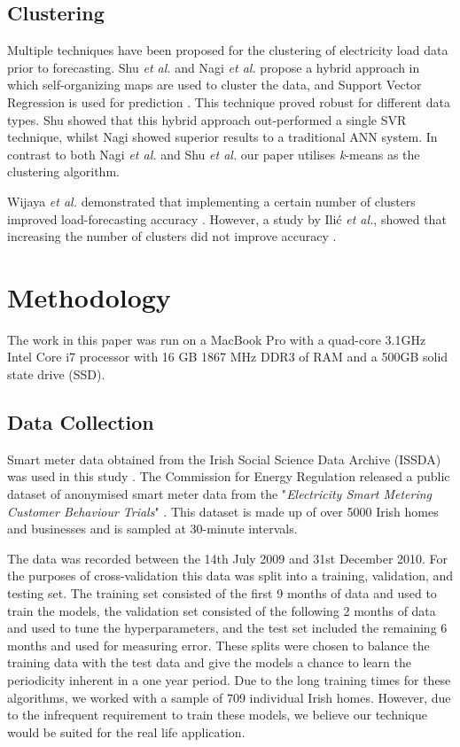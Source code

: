 \subsection{Clustering}

Multiple techniques have been proposed for the clustering of electricity load data prior to forecasting. Shu \textit{et al.} and Nagi \textit{et al.} propose a hybrid approach in which self-organizing maps are used to cluster the data, and Support Vector Regression is used for prediction \cite{Shu2006, Tiong2008}. This technique proved robust for different data types. Shu showed that this hybrid approach out-performed a single SVR technique, whilst Nagi showed superior results to a traditional ANN system. In contrast to both Nagi \textit{et al.} and Shu \textit{et al.} our paper utilises \textit{k}-means as the clustering algorithm.

Wijaya \textit{et al.} demonstrated that implementing  a certain number of clusters improved load-forecasting accuracy \cite{Wijaya2010}. However, a study by Ili\'c \textit{et al.}, showed that increasing the number of clusters did not improve accuracy \cite{Ilic2013}.

\section{Methodology}

The work in this paper was run on a MacBook Pro with a quad-core 3.1GHz Intel Core i7 processor with 16 GB 1867 MHz DDR3 of RAM and a 500GB solid state drive (SSD).

\subsection{Data Collection}

Smart meter data obtained from the Irish Social Science Data Archive (ISSDA) was used in this study \cite{cer_2012}. The Commission for Energy Regulation released a public dataset of anonymised smart meter data from the "\textit{Electricity Smart Metering Customer Behaviour Trials}" \cite{setis}. This dataset is made up of over 5000 Irish homes and businesses and is sampled at 30-minute intervals.

The data was recorded between the 14th July 2009 and 31st December 2010. For the purposes of cross-validation this data was split into a training, validation, and testing set. The training set consisted of the first 9 months of data and used to train the models, the validation set consisted of the following 2 months of data and used to tune the hyperparameters, and the test set included the remaining 6 months and used for measuring error. These splits were chosen to balance the training data with the test data and give the models a chance to learn the periodicity inherent in a one year period. Due to the long training times for these algorithms, we worked with a sample of 709 individual Irish homes. However, due to the infrequent requirement to train these models, we believe our technique would be suited for the real life application.


